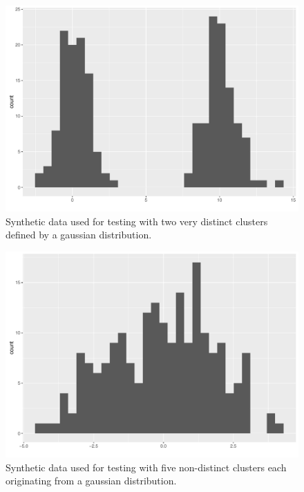 \documentclass[10pt,a4paper]{article}
\begin{document}
\begin{figure}[H]
\label{fig:testdata}
\includegraphics[width = \linewidth]{plots/testdata1_hist.pdf}
\caption{Synthetic data used for testing with two very distinct clusters defined by a gaussian distribution.}
\end{figure}

\begin{figure}[H]
\label{fig:gaussiandata}
\includegraphics[width = \linewidth]{plots/gaussiandata1_hist.pdf}
\caption{Synthetic data used for testing with five non-distinct clusters each originating from a gaussian distribution.}
\end{figure}
\end{document}
